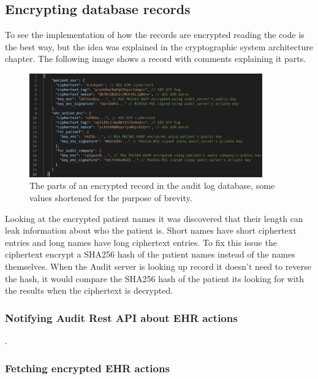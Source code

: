 \documentclass[11pt]{article}
\begin{document}
\begin{flushleft}
\subsection{Encrypting database records}

To see the implementation of how the records are encrypted reading the code is the best way, but the idea was explained in the cryptographic system architecture chapter. The following image shows a record with comments explaining it parts.

\begin{figure}[h!]
	\begin{center}
		\includegraphics[width = 380px]{images/enc_record_parts.png}
		\caption{The parts of an encrypted record in the audit log database, some values shortened for the purpose of brevity.}
	\end{center}
\end{figure}

Looking at the encrypted patient names it was discovered that their length can leak information about who the patient is. Short names have short ciphertext entries and long names have long ciphertext entries. To fix this issue the ciphertext encrypt a SHA256 hash of the patient names instead of the names themselves. When the Audit server is looking up record it doesn't need to reverse the hash, it would compare the SHA256 hash of the patient its looking for with the results when the ciphertext is decrypted.







\newpage

\subsubsection{Notifying Audit Rest API about EHR actions}

.

\newpage


\subsubsection{Fetching encrypted EHR actions}





\end{flushleft}
\end{document}
